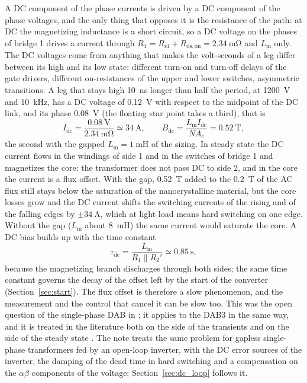 \documentclass[12pt,a4paper]{scrartcl}
\newcommand{\ped}[1]{_{\mathrm{#1}}}
\begin{document}
\begin{onehalfspace}
A DC component of the phase currents is driven by a DC component of the phase voltages, and the only thing that opposes it is the resistance of the path: at DC the magnetizing inductance is a short circuit, so a DC voltage on the phases of bridge 1 drives a current through $R\ped{1} = R\ped{s1} + R\ped{ds,on} = \SI{2.34}{\milli\ohm}$ and $L\ped{m}$ only. The DC voltages come from anything that makes the volt-seconds of a leg differ between its high and its low state: different turn-on and turn-off delays of the gate drivers, different on-resistances of the upper and lower switches, asymmetric transitions. A leg that stays high \SI{10}{\nano\second} longer than half the period, at \SI{1200}{\volt} and \SI{10}{\kilo\hertz}, has a DC voltage of \SI{0.12}{\volt} with respect to the midpoint of the DC link, and its phase \SI{0.08}{\volt} (the floating star point takes a third), that is
\begin{equation}
	I\ped{dc} = \frac{\SI{0.08}{\volt}}{\SI{2.34}{\milli\ohm}} \simeq \SI{34}{\ampere}, \qquad
	B\ped{dc} = \frac{L\ped{m} I\ped{dc}}{N A\ped{c}} = \SI{0.52}{\tesla},
	\label{eq:dcbias}
\end{equation}
the second with the gapped $L\ped{m} = \SI{1}{\milli\henry}$ of the sizing. In steady state the DC current flows in the windings of side 1 and in the switches of bridge 1 and magnetizes the core: the transformer does not pass DC to side 2, and in the core the current is a flux offset. With the gap, \SI{0.52}{\tesla} added to the \SI{0.2}{\tesla} of the AC flux still stays below the saturation of the nanocrystalline material, but the core losses grow and the DC current shifts the switching currents of the rising and of the falling edges by $\pm\SI{34}{\ampere}$, which at light load means hard switching on one edge. Without the gap ($L\ped{m}$ about \SI{8}{\milli\henry}) the same current would saturate the core. A DC bias builds up with the time constant
\begin{equation}
	\tau\ped{dc} = \frac{L\ped{m}}{R\ped{1} \parallel R\ped{2}'} \simeq \SI{0.85}{\second},
	\label{eq:taudc}
\end{equation}
because the magnetizing branch discharges through both sides; the same time constant governs the decay of the offset left by the start of the converter (Section~\ref{sec:start}). The flux offset is therefore a slow phenomenon, and the measurement and the control that cancel it can be slow too. This was the open question of the single-phase DAB in \cite{sst_doc}; it applies to the DAB3 in the same way, and it is treated in the literature both on the side of the transients \cite{zhao2016} and on the side of the steady state \cite{ortiz2014}. The note \cite{dcbias_note} treats the same problem for gapless single-phase transformers fed by an open-loop inverter, with the DC error sources of the inverter, the damping of the dead time in hard switching and a compensation on the $\alpha\beta$ components of the voltage; Section~\ref{sec:dc_loop} follows it.


\end{onehalfspace}
\end{document}
